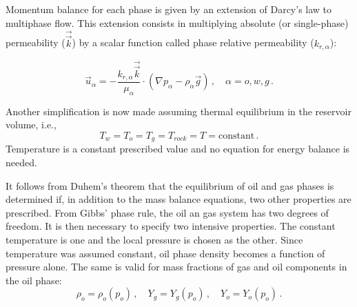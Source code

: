 \documentclass[final,authoryear,5p,twocolumn,10pt]{elsarticle}
\begin{document}
Momentum balance for each phase is given by an extension of Darcy's law to multiphase flow. This extension consists in multiplying absolute (or single-phase) permeability ($\vec{\vec{k}}$) by a scalar function called phase relative permeability ($k_{r,\alpha}$):

\begin{equation}\label{eq: exdarcy}
\vec{u}_\alpha = -\frac{k_{r,\alpha} \vec{\vec{k}}}{\mu_\alpha}\cdot \left(\nabla p_\alpha - \rho_\alpha \vec{g}\right) \, , \quad \alpha=o,w,g \, .
\end{equation}


Another simplification is now made assuming thermal equilibrium in the reservoir volume, i.e.,
\begin{equation}
T_w = T_o = T_g = T_{rock} = T = \text{constant} \, .
\end{equation}
Temperature is a constant prescribed value and no equation for energy balance is needed. 


It follows from Duhem's theorem that the equilibrium of oil and gas phases is determined if, in addition to the mass balance equations, two other properties are prescribed. From Gibbs' phase rule, the oil an gas system has two degrees of freedom. It is then necessary to specify two intensive properties. The constant temperature is one and the local pressure is chosen as the other. Since temperature was assumed constant, oil phase density becomes a function of pressure alone. The same is valid for mass fractions of gas and oil components in the oil phase:
\begin{equation}
\rho_o = \rho_o \left(p_o\right) \, , \quad Y_g = Y_g (p_o) \, , \quad Y_o = Y_o (p_o) \, .
\end{equation}
\end{document}
